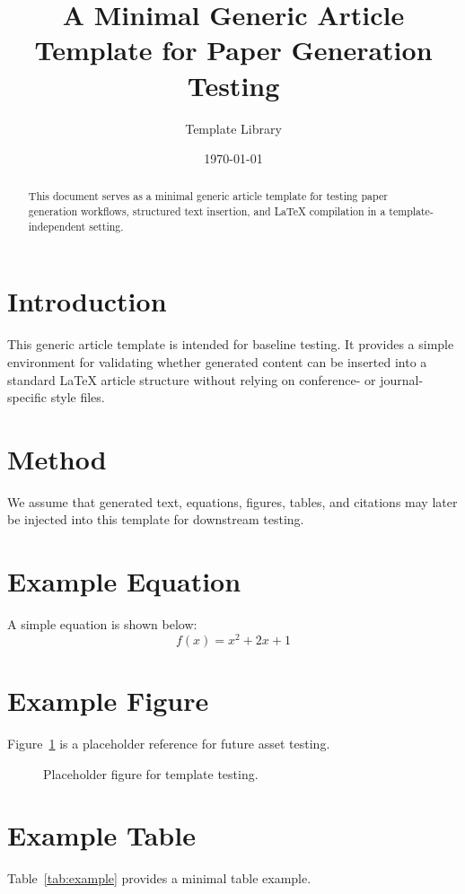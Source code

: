 \documentclass[11pt]{article}
\title{A Minimal Generic Article Template for Paper Generation Testing}
\author{Template Library}
\date{\today}
\begin{document}
\maketitle

\begin{abstract}
This document serves as a minimal generic article template for testing paper generation workflows, structured text insertion, and LaTeX compilation in a template-independent setting.
\end{abstract}

\section{Introduction}
This generic article template is intended for baseline testing. It provides a simple environment for validating whether generated content can be inserted into a standard \LaTeX{} article structure without relying on conference- or journal-specific style files.

\section{Method}
We assume that generated text, equations, figures, tables, and citations may later be injected into this template for downstream testing.

\section{Example Equation}
A simple equation is shown below:
\begin{equation}
f(x) = x^2 + 2x + 1
\end{equation}

\section{Example Figure}
Figure~\ref{fig:placeholder} is a placeholder reference for future asset testing.

\begin{figure}[h]
\centering
\fbox{\rule{0pt}{1.5in}\rule{0.8\linewidth}{0pt}}
\caption{Placeholder figure for template testing.}
\label{fig:placeholder}
\end{figure}

\section{Example Table}
Table~\ref{tab:example} provides a minimal table example.
\end{document}
